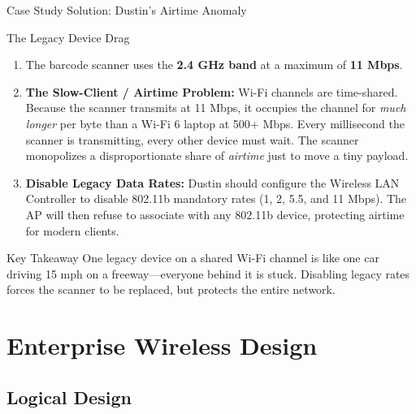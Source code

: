 \documentclass[aspectratio=169]{beamer}
\begin{document}
\begin{frame}{Case Study Solution: Dustin's Airtime Anomaly}
    \begin{casesolution}{The Legacy Device Drag}
        \footnotesize
        \begin{enumerate}
            \item The barcode scanner uses the \textbf{2.4 GHz band} at a maximum of \textbf{11 Mbps}.
            \item \textbf{The Slow-Client / Airtime Problem:} Wi-Fi channels are time-shared. Because the scanner transmits at 11 Mbps, it occupies the channel for \emph{much longer} per byte than a Wi-Fi 6 laptop at 500+ Mbps. Every millisecond the scanner is transmitting, every other device must wait. The scanner monopolizes a disproportionate share of \emph{airtime} just to move a tiny payload.
            \item \textbf{Disable Legacy Data Rates:} Dustin should configure the Wireless LAN Controller to disable 802.11b mandatory rates (1, 2, 5.5, and 11 Mbps). The AP will then refuse to associate with any 802.11b device, protecting airtime for modern clients.
        \end{enumerate}
    \end{casesolution}

    \begin{alertblock}{Key Takeaway}
        \footnotesize
        One legacy device on a shared Wi-Fi channel is like one car driving 15 mph on a freeway---everyone behind it is stuck. Disabling legacy rates forces the scanner to be replaced, but protects the entire network.
    \end{alertblock}
\end{frame}

\section{Enterprise Wireless Design}
\subsection{Logical Design}

\end{document}
